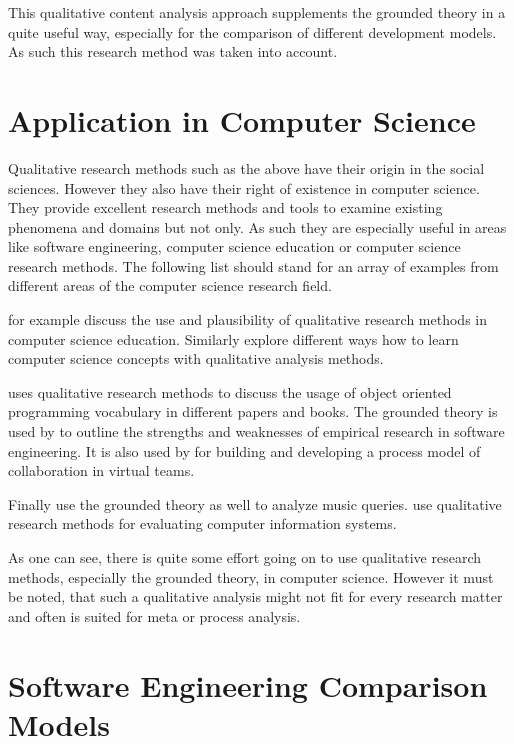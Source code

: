 This qualitative content analysis approach supplements the grounded theory in a
quite useful way, especially for the comparison of different development
models. As such this research method was taken into account.


\section{Application in Computer Science} %

Qualitative research methods such as the above have their origin in the social
sciences. However they also have their right of existence in computer science.
They provide excellent research methods and tools to examine existing phenomena
and domains but not only. As such they are especially useful in areas like
software engineering, computer science education or computer science research
methods. The following list should stand for an array of examples from
different areas of the computer science research field.

\textcite{Hazzan2006} for example discuss the use and plausibility of
qualitative research methods in computer science education. Similarly
\textcite{Meerbaum-Salant2010} explore different ways how to learn computer
science concepts with qualitative analysis methods.

\textcite{Armstrong2006} uses qualitative research methods to discuss the usage
of object oriented programming vocabulary in different papers and books. The
grounded theory is used by \textcite{Perry2000} to outline the strengths and
weaknesses of empirical research in software engineering. It is also used by
\textcite{Sarker2001} for building and developing a process model of
collaboration in virtual teams.

Finally \textcite{Bainbridge2003} use the grounded theory as well to analyze
music queries. \textcite{Kaplan1994} use qualitative research methods for
evaluating computer information systems.

As one can see, there is quite some effort going on to use qualitative research
methods, especially the grounded theory, in computer science. However it must
be noted, that such a qualitative analysis might not fit for every research
matter and often is suited for meta or process analysis.


\section{Software Engineering Comparison Models} %

